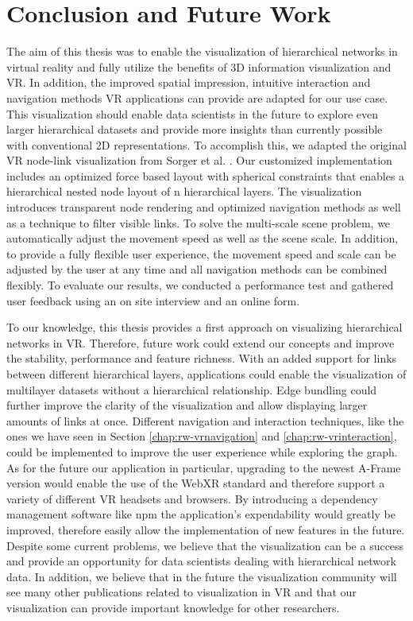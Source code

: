 \chapter{Conclusion and Future Work}
\label{chap:conclusion}

The aim of this thesis was to enable the visualization of hierarchical networks in virtual reality and fully utilize the benefits of 3D information visualization and VR. In addition, the improved spatial impression, intuitive interaction and navigation methods VR applications can provide are adapted for our use case. 
This visualization should enable data scientists in the future to explore even larger hierarchical datasets and provide more insights than currently possible with conventional 2D representations.
To accomplish this, we adapted the original VR node-link visualization from Sorger et al. \cite{sorger_immersive_2019}. 
Our customized implementation includes an optimized force based layout with spherical constraints that enables a hierarchical nested node layout of n hierarchical layers.
The visualization introduces transparent node rendering and optimized navigation methods as well as a technique to filter visible links. 
To solve the multi-scale scene problem, we automatically adjust the movement speed as well as the scene scale.
In addition, to provide a fully flexible user experience, the movement speed and scale can be adjusted by the user at any time and all navigation methods can be combined flexibly.
To evaluate our results, we conducted a performance test and gathered user feedback using an on site interview and an online form.

To our knowledge, this thesis provides a first approach on visualizing hierarchical networks in VR. Therefore, future work could extend our concepts and improve the stability, performance and feature richness.
With an added support for links between different hierarchical layers, applications could enable the visualization of multilayer datasets without a hierarchical relationship. Edge bundling could further improve the clarity of the visualization and allow displaying larger amounts of links at once. Different navigation and interaction techniques, like the ones we have seen in Section \ref{chap:rw-vrnavigation} and \ref{chap:rw-vrinteraction}, could be implemented to improve the user experience while exploring the graph.\
\\
As for the future our application in particular, upgrading to the newest A-Frame version would enable the use of the WebXR standard and therefore support a variety of different VR headsets and browsers. By introducing a dependency management software like npm the application's expendability would greatly be improved, therefore easily allow the implementation of new features in the future.
\\
Despite some current problems, we believe that the visualization can be a success and provide an opportunity for data scientists dealing with hierarchical network data. In addition, we believe that in the future the visualization community will see many other publications related to visualization in VR and that our visualization can provide important knowledge for other researchers.